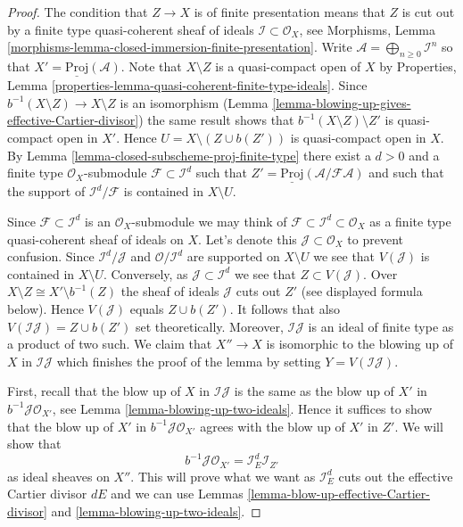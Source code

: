 \begin{proof}
The condition that $Z \to X$ is of finite presentation means that
$Z$ is cut out by a finite type quasi-coherent sheaf of ideals
$\mathcal{I} \subset \mathcal{O}_X$, see
Morphisms, Lemma \ref{morphisms-lemma-closed-immersion-finite-presentation}.
Write $\mathcal{A} = \bigoplus_{n \geq 0} \mathcal{I}^n$ so that
$X' = \underline{\text{Proj}}(\mathcal{A})$.
Note that $X \setminus Z$ is a quasi-compact open of $X$ by
Properties, Lemma \ref{properties-lemma-quasi-coherent-finite-type-ideals}.
Since $b^{-1}(X \setminus Z) \to X \setminus Z$ is an isomorphism
(Lemma \ref{lemma-blowing-up-gives-effective-Cartier-divisor}) the same
result shows that
$b^{-1}(X \setminus Z) \setminus Z'$ is quasi-compact open in $X'$.
Hence $U = X \setminus (Z \cup b(Z'))$ is quasi-compact open in $X$.
By Lemma \ref{lemma-closed-subscheme-proj-finite-type}
there exist a $d > 0$ and a finite type
$\mathcal{O}_X$-submodule $\mathcal{F} \subset \mathcal{I}^d$ such
that $Z' = \underline{\text{Proj}}(\mathcal{A}/\mathcal{F}\mathcal{A})$
and such that the support of $\mathcal{I}^d/\mathcal{F}$ is contained
in $X \setminus U$.

\medskip\noindent
Since $\mathcal{F} \subset \mathcal{I}^d$ is an $\mathcal{O}_X$-submodule
we may think of $\mathcal{F} \subset \mathcal{I}^d \subset \mathcal{O}_X$
as a finite type quasi-coherent sheaf of ideals on $X$. Let's denote this
$\mathcal{J} \subset \mathcal{O}_X$ to prevent confusion. Since
$\mathcal{I}^d / \mathcal{J}$ and $\mathcal{O}/\mathcal{I}^d$
are supported on $X \setminus U$ we see that $V(\mathcal{J})$ is contained
in $X \setminus U$. Conversely, as $\mathcal{J} \subset \mathcal{I}^d$
we see that $Z \subset V(\mathcal{J})$. Over
$X \setminus Z \cong X' \setminus b^{-1}(Z)$ the sheaf of ideals
$\mathcal{J}$ cuts out $Z'$ (see displayed formula below). Hence
$V(\mathcal{J})$ equals $Z \cup b(Z')$. It follows that also
$V(\mathcal{I}\mathcal{J}) = Z \cup b(Z')$ set theoretically. Moreover,
$\mathcal{I}\mathcal{J}$ is an ideal of finite type as a product of two such.
We claim that $X'' \to X$ is isomorphic to the blowing up of $X$ in
$\mathcal{I}\mathcal{J}$ which finishes the proof of the lemma by setting
$Y = V(\mathcal{I}\mathcal{J})$.

\medskip\noindent
First, recall that the blow up of $X$ in $\mathcal{I}\mathcal{J}$
is the same as the blow up of $X'$ in $b^{-1}\mathcal{J} \mathcal{O}_{X'}$,
see Lemma \ref{lemma-blowing-up-two-ideals}.
Hence it suffices to show that the blow up of $X'$ in
$b^{-1}\mathcal{J} \mathcal{O}_{X'}$ agrees with the blow up of $X'$
in $Z'$. We will show that
$$
b^{-1}\mathcal{J} \mathcal{O}_{X'} = \mathcal{I}_E^d \mathcal{I}_{Z'}
$$
as ideal sheaves on $X''$. This will prove what we want as
$\mathcal{I}_E^d$ cuts out the effective Cartier divisor $dE$
and we can use Lemmas \ref{lemma-blow-up-effective-Cartier-divisor} and
\ref{lemma-blowing-up-two-ideals}.


\end{proof}

